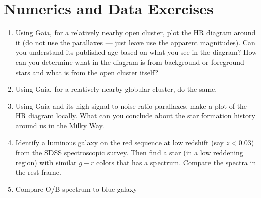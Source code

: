 %

\section{Numerics and Data Exercises}

\begin{enumerate}
\item Using Gaia, for a relatively nearby open cluster,
plot the HR diagram around it (do not use the parallaxes --- just
leave use the apparent magnitudes). Can you understand its published
age based on what you see in the diagram? How can you determine what
in the diagram is from background or foreground stars and what is from
the open cluster itself?
\item Using Gaia, for a relatively nearby globular cluster, do the
same.
\item Using Gaia and its high signal-to-noise ratio parallaxes,
make a plot of the HR diagram locally. What can you conclude about the
star formation history around us in the Milky Way.
\item Identify a luminous galaxy on the red sequence at low redshift
(say $z<0.03$) from the SDSS spectroscopic survey. Then find a star
(in a low reddening region) with similar $g-r$ colors that has a
spectrum. Compare the spectra in the rest frame.
\item Compare O/B spectrum to blue galaxy
\end{enumerate}


  
